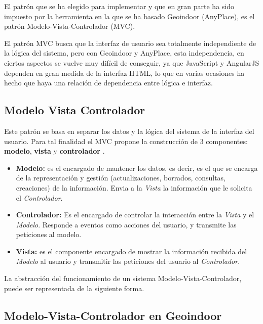 El patrón que se ha elegido para implementar y que en gran parte ha sido impuesto por la herramienta en la que se ha basado Geoindoor (AnyPlace), es el patrón Modelo-Vista-Controlador (MVC).

El patrón MVC busca que la interfaz de usuario sea totalmente independiente de la lógica del sistema, pero con Geoindoor y AnyPlace, esta independencia, en ciertos aspectos se vuelve muy difícil de conseguir, ya que JavaScript y AngularJS dependen en gran medida de la interfaz HTML, lo que en varias ocasiones ha hecho que haya una relación de dependencia entre lógica e interfaz.

\subsection{Modelo Vista Controlador}

Este patrón se basa en separar los datos y la lógica del sistema de la interfaz del usuario. Para tal finalidad el MVC propone la construcción de 3 componentes: \textbf{modelo}, \textbf{vista} y \textbf{controlador} \cite{mvcwiki}.

\begin{itemize}
	\item \textbf{Modelo:} es el encargado de mantener los datos, es decir, es el que se encarga de la representación y gestión (actualizaciones, borrados, consultas, creaciones) de la información. Envia a la \textit{Vista} la información que le solicita el \textit{Controlador}.
	\item \textbf{Controlador:} Es el encargado de controlar la interacción entre la \textit{Vista} y el \textit{Modelo}. Responde a eventos como acciones del usuario, y transmite las peticiones al modelo.
	\item \textbf{Vista:} es el componente encargado de mostrar la información recibida del \textit{Modelo} al usuario y transmitir las peticiones del usuario al \textit{Controlador}.
\end{itemize}


La abstracción del funcionamiento de un sistema Modelo-Vista-Controlador, puede ser representada de la siguiente forma.


\subsection{Modelo-Vista-Controlador en Geoindoor}

